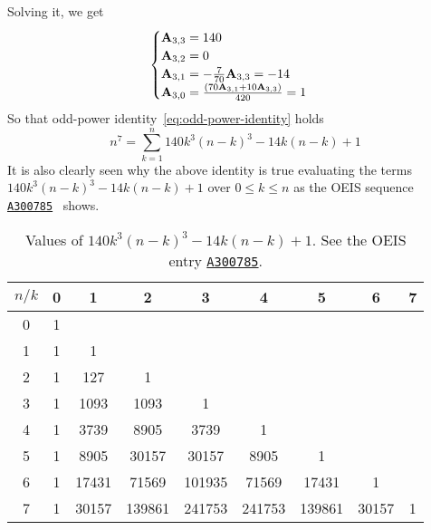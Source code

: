 Solving it, we get
\begin{equation*}
    \begin{cases}
        {\mathbf{A}} \sb{3,3} = 140 \\
        {\mathbf{A}} \sb{3,2} = 0 \\
        {\mathbf{A}} \sb{3,1} = -\frac{7}{70} {\mathbf{A}} \sb{3,3} = -14 \\
        {\mathbf{A}} \sb{3,0} = \frac{(70 {\mathbf{A}} \sb{3,1} + 10 {\mathbf{A}} \sb{3,3})}{420} = 1
    \end{cases}
\end{equation*}
So that odd-power identity~\eqref{eq:odd-power-identity} holds
\begin{equation*}
    n^7 = \sum_{k=1}^{n} 140 k^3 (n-k)^3 - 14k(n-k) + 1
\end{equation*}
It is also clearly seen
why the above identity is true evaluating the terms $140 k^3 (n-k)^3 - 14k(n-k) + 1$ over $0 \leq k \leq n$ as
the OEIS sequence \href{https://oeis.org/A300785}{\texttt{A300785}}~\cite{kolosov2018seventh} shows.
\begin{table}[H]
    \setlength\extrarowheight{-6pt}
    \begin{tabular}{c|cccccccc}
        $n/k$ & 0 & 1     & 2      & 3      & 4      & 5      & 6     & 7 \\
        \hline
        0     & 1 &       &        &        &        &        &       &   \\
        1     & 1 & 1     &        &        &        &        &       &   \\
        2     & 1 & 127   & 1      &        &        &        &       &   \\
        3     & 1 & 1093  & 1093   & 1      &        &        &       &   \\
        4     & 1 & 3739  & 8905   & 3739   & 1      &        &       &   \\
        5     & 1 & 8905  & 30157  & 30157  & 8905   & 1      &       &   \\
        6     & 1 & 17431 & 71569  & 101935 & 71569  & 17431  & 1     &   \\
        7     & 1 & 30157 & 139861 & 241753 & 241753 & 139861 & 30157 & 1
    \end{tabular}
    \caption{Values of $140 k^3 (n-k)^3 - 14k(n-k) + 1$.
    See the OEIS entry \href{https://oeis.org/A300785}{\texttt{A300785}}.}
    \label{tab:row-sums-gives-seventh-power}
\end{table}
